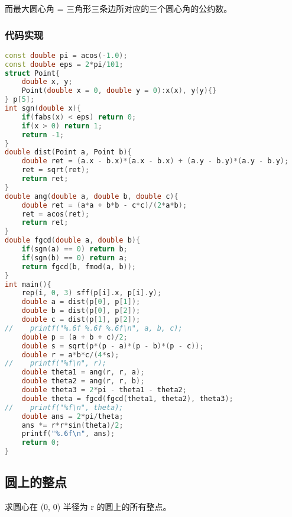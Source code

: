 而最大圆心角 = 三角形三条边所对应的三个圆心角的公约数。

\subsubsection{代码实现}

\begin{lstlisting}[language=C++]
const double pi = acos(-1.0);
const double eps = 2*pi/101;
struct Point{
    double x, y;
    Point(double x = 0, double y = 0):x(x), y(y){}
} p[5];
int sgn(double x){
    if(fabs(x) < eps) return 0;
    if(x > 0) return 1;
    return -1;
}
double dist(Point a, Point b){
    double ret = (a.x - b.x)*(a.x - b.x) + (a.y - b.y)*(a.y - b.y);
    ret = sqrt(ret);
    return ret;
}
double ang(double a, double b, double c){
    double ret = (a*a + b*b - c*c)/(2*a*b);
    ret = acos(ret);
    return ret;
}
double fgcd(double a, double b){
    if(sgn(a) == 0) return b;
    if(sgn(b) == 0) return a;
    return fgcd(b, fmod(a, b));
}
int main(){
    rep(i, 0, 3) sff(p[i].x, p[i].y);
    double a = dist(p[0], p[1]);
    double b = dist(p[0], p[2]);
    double c = dist(p[1], p[2]);
//    printf("%.6f %.6f %.6f\n", a, b, c);
    double p = (a + b + c)/2;
    double s = sqrt(p*(p - a)*(p - b)*(p - c));
    double r = a*b*c/(4*s);
//    printf("%f\n", r);
    double theta1 = ang(r, r, a);
    double theta2 = ang(r, r, b);
    double theta3 = 2*pi - theta1 - theta2;
    double theta = fgcd(fgcd(theta1, theta2), theta3);
//    printf("%f\n", theta);
    double ans = 2*pi/theta;
    ans *= r*r*sin(theta)/2;
    printf("%.6f\n", ans);
    return 0;
}
\end{lstlisting}

\subsection{圆上的整点}

求圆心在 (0, 0) 半径为 r 的圆上的所有整点。

